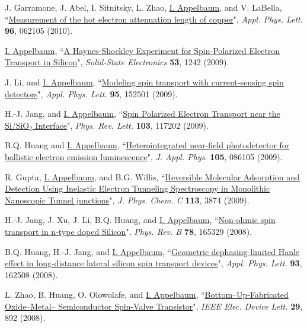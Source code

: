 \documentclass[paper=letter,fontsize=11pt]{scrartcl} %
\newcommand{\PaperEntry}[7]{
		\noindent #1, ``\href{#7}{#2}", \textit{#3} \textbf{#4}, #5 (#6).}
\begin{document}
\begin{etaremune}
\item\PaperEntry{J. Garramone, J. Abel, I. Sitnitsky, L. Zhao, \underline{I. Appelbaum}, and V. LaBella}{Measurement of the hot electron attenuation length of copper}{Appl. Phys. Lett.}{96}{062105}{2010}{http://dx.doi.org/10.1063/1.3299712}

\item\PaperEntry{\underline{I. Appelbaum}}{A Haynes-Shockley Experiment for Spin-Polarized Electron Transport in Silicon}{Solid-State Electronics}{53}{1242}{2009}{http://dx.doi.org/10.1016/j.sse.2009.09.012}

\item\PaperEntry{J. Li, and \underline{I. Appelbaum}}{Modeling spin transport with current-sensing spin detectors}{Appl. Phys. Lett.}{95}{152501}{2009}{http://dx.doi.org/10.1063/1.3241080}

\item\PaperEntry{H.-J. Jang, and \underline{I. Appelbaum}}{Spin Polarized Electron Transport near the Si/SiO$_2$ Interface}{Phys. Rev. Lett.}{103}{117202}{2009}{http://dx.doi.org/10.1103/PhysRevLett.103.117202}

\item\PaperEntry{B.Q. Huang and \underline{I. Appelbaum}}{Heterointegrated near-field photodetector for ballistic electron emission luminescence}{J. Appl. Phys.}{105}{086105}{2009}{http://dx.doi.org/10.1063/1.3116507}

\item\PaperEntry{R. Gupta, \underline{I. Appelbaum}, and B.G. Willis}{Reversible Molecular Adsorption and Detection Using Inelastic Electron Tunneling Spectroscopy in Monolithic Nanoscopic Tunnel junctions}{J. Phys. Chem. C}{113}{3874}{2009}{http://dx.doi.org/10.1021/jp806074f}

\item\PaperEntry{H.-J. Jang, J. Xu, J. Li, B.Q. Huang, and \underline{I. Appelbaum}}{Non-ohmic spin transport in n-type doped Silicon}{Phys. Rev. B}{78}{165329}{2008}{http://dx.doi.org/10.1103/PhysRevB.78.165329}

\item\PaperEntry{B.Q. Huang, H.-J. Jang, and \underline{I. Appelbaum}}{Geometric dephasing-limited Hanle effect in long-distance lateral silicon spin transport devices}{Appl. Phys. Lett.}{93}{162508}{2008}{http://dx.doi.org/10.1063/1.3006333}

\item\PaperEntry{L. Zhao, B. Huang, O. Olowolafe, and \underline{I. Appelbaum}}{Bottom–Up-Fabricated Oxide–Metal– Semiconductor Spin-Valve Transistor}{IEEE Elec. Device Lett.}{29}{892}{2008}{http://dx.doi.org/10.1109/LED.2008.2001177}



\end{etaremune}
\end{document}
